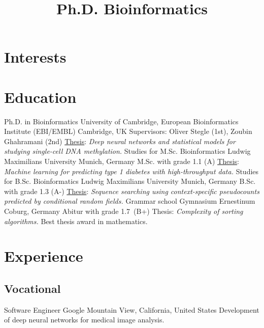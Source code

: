 \documentclass[11pt,a4paper]{moderncv}
\title{Ph.D. Bioinformatics}
\newcommand\chref[3][magenta]{\href{#2}{\small\color{#1}#3}}
\begin{document}
\maketitle

\section{Interests}

\section{Education}
         {Ph.D. in Bioinformatics}
         {\hfill\break University of Cambridge, European Bioinformatics Institute (EBI/EMBL)}
         {Cambridge, UK}
         {}
         {Supervisors: Oliver Stegle (1st), Zoubin Ghahramani (2nd)
           \hfill\break \chref{https://cangermueller.com/wp-content/papercite-data/pdf/angermueller_christof_deep_2017.pdf}{Thesis}: \textit{Deep neural networks and statistical models for studying single-cell DNA methylation.}}
         {Studies for M.Sc. Bioinformatics}
         {\hfill\break Ludwig Maximilians University}
         {Munich, Germany}
         {\hfill\break M.Sc. with grade 1.1 (A)}
         {\chref{https://cangermueller.com/wp-content/papercite-data/pdf/angermuller_machine_2013.pdf}{Thesis}: \textit{Machine learning for predicting type 1 diabetes with high-throughput data.}}
         {Studies for B.Sc. Bioinformatics}
         {\hfill\break Ludwig Maximilians University}
         {Munich, Germany}
         {\hfill\break B.Sc. with grade 1.3 (A-)}
         {\chref{https://cangermueller.com/wp-content/papercite-data/pdf/angermuller_sequence_2011.pdf}{Thesis}: \textit{Sequence searching using context-specific pseudocounts predicted by conditional random fields.}}
         {Grammar school}
         {Gymnasium Ernestinum}
         {Coburg, Germany}
         {\hfill\break Abitur with grade 1.7~(B+)}
         {Thesis: \textit{Complexity of sorting algorithms.} Best thesis award in mathematics.}

\clearpage
\newpage

\section{Experience}
\subsection{Vocational}
         {Software Engineer}
         {\hfill\break Google}
         {Mountain View, California, United States}
         {}
         {Development of deep neural networks for medical image analysis.}
\end{document}
